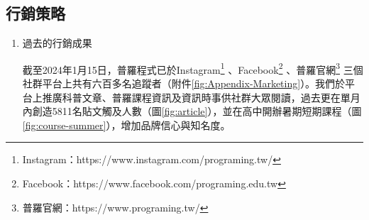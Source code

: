 \subsection{行銷策略}

\begin{enumerate}[label=(\arabic*)]
  \setlength{\parindent}{2em}
  \item 過去的行銷成果
    \par 截至2024年1月15日，普羅程式已於Instagram\footnote{Instagram：https://www.instagram.com/programing.tw/}
    、Facebook\footnote{Facebook：https://www.facebook.com/programing.edu.tw}
    、普羅官網\footnote{普羅官網：https://www.programing.tw/}
    三個社群平台上共有六百多名追蹤者（附件\ref{fig:Appendix-Marketing}）。我們於平台上推廣科普文章、普羅課程資訊及資訊時事供社群大眾閱讀，過去更在單月內創造5811名貼文觸及人數（圖\ref{fig:article}），並在高中開辦暑期短期課程（圖\ref{fig:course-summer}），增加品牌信心與知名度。
    
    

\end{enumerate}
